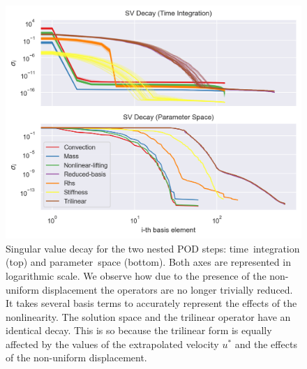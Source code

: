 \documentclass[../../thesis.tex]{subfiles}
\begin{document}
\begin{figure}[h]
    \includegraphics[width =\columnwidth]{research_project/piston/figures/nonlinear_displacement/separable/sigmas_loglog.png}
    \caption{Singular value decay for the two nested POD steps: 
    \mbox{time integration} (top) and \mbox{parameter space} (bottom).
    Both axes are represented in logarithmic scale.
    We observe how due to the presence of the non-uniform displacement
    the operators are no longer trivially reduced.
    It takes several basis terms to accurately represent 
    the effects of the nonlinearity.
    The solution space and the trilinear operator have an identical decay.
    This is so because the trilinear form is equally affected by the 
    values of the extrapolated velocity $u^{*}$ 
    and the effects of the non-uniform displacement.}
    \label{fig:nlinear_disp_sep_loglog}
\end{figure}
\end{document}
